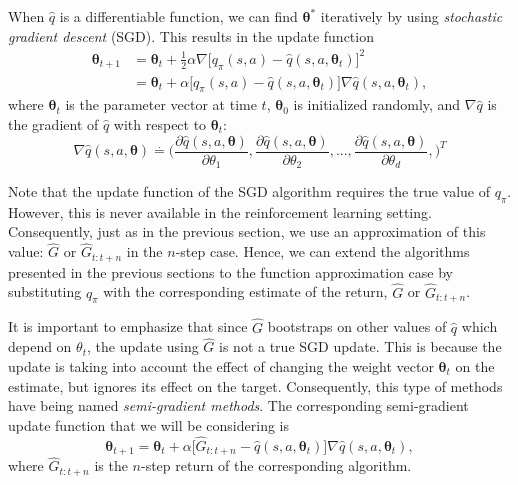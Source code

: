 When $\hat{q}$ is a differentiable function, we can find $\boldsymbol\theta^*$ iteratively by using \textit{stochastic gradient descent} (SGD). This results in the update function
%
\begin{align}
\label{eq:sgd_update}
\boldsymbol\theta_{t+1} &= \boldsymbol\theta_t + \frac{1}{2}\alpha \nabla \big[ q_\pi(s,a) 
	- \hat{q}(s,a,\boldsymbol\theta_t) \big]^2 \nonumber \\
%
&= \boldsymbol\theta_t + \alpha \big[ q_\pi(s,a) - \hat{q}(s,a,\boldsymbol\theta_t) \big] 
	\nabla \hat{q}(s,a,\boldsymbol\theta_t),
\end{align}
where $\boldsymbol\theta_t$ is the parameter vector at time $t$, $\boldsymbol\theta_0$ is initialized randomly, and $\nabla\hat{q}$ is the gradient of $\hat{q}$ with respect to $\boldsymbol\theta_t$:
%
\begin{equation}
\label{eq:q_grad}
\nabla \hat{q}(s,a, \boldsymbol\theta) \overset{.}{=} \Big(
	\frac{\partial \hat{q}(s,a,\boldsymbol\theta)}{\partial \theta_1},
    \frac{\partial \hat{q}(s,a,\boldsymbol\theta)}{\partial \theta_2}, ...,
    \frac{\partial \hat{q}(s,a,\boldsymbol\theta)}{\partial \theta_d},\Big)^T
\end{equation}
%

Note that the update function of the SGD algorithm requires the true value of $q_\pi$. 
However, this is never available in the reinforcement learning setting. 
Consequently, just as in the previous section, we use an approximation of this value: $\hat{G}$ or $\hat{G}_{t:t+n}$ in the $n$-step case. 
Hence, we can extend the algorithms presented in the previous sections to the function approximation case by substituting $q_\pi$ with the corresponding estimate of the return, $\hat{G}$ or $\hat{G}_{t:t+n}$.

It is important to emphasize that since $\hat{G}$ bootstraps on other values of $\hat{q}$ which depend on $\theta_t$, the update using $\hat{G}$ is not a true SGD update.
This is because the update is taking into account the effect of changing the weight vector $\boldsymbol\theta_t$ on the estimate, but ignores its effect on the target.
Consequently, this type of methods have being named \textit{semi-gradient methods}.
The corresponding semi-gradient update function that we will be considering is
%
\begin{equation}
\label{eq:semi_grad_update}
\boldsymbol\theta_{t+1} = \boldsymbol\theta_t + \alpha \big[ \hat{G}_{t:t+n} 
	- \hat{q}(s,a,\boldsymbol\theta_t) \big] \nabla \hat{q}(s,a,\boldsymbol\theta_t),
\end{equation}
where $\hat{G}_{t:t+n}$ is the $n$-step return of the corresponding algorithm.

